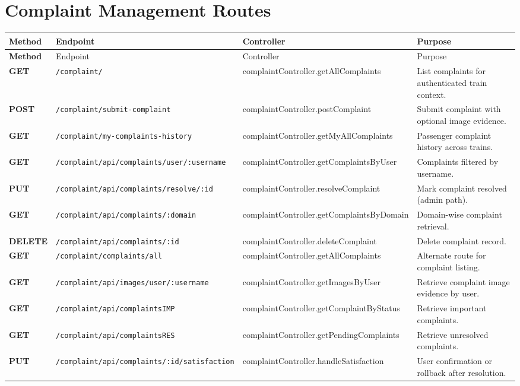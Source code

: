 \documentclass[12pt,a4paper]{report}
\begin{document}
\section{Complaint Management Routes}
\begin{longtable}{>{\bfseries}p{} p{} p{} p{}}
\toprule
\rowcolor{TableHeader}
\textcolor{TableHeaderText}{Method} & \textcolor{TableHeaderText}{Endpoint} & \textcolor{TableHeaderText}{Controller} & \textcolor{TableHeaderText}{Purpose} \\
\midrule
\endfirsthead
\toprule
\rowcolor{TableHeader}
\textcolor{TableHeaderText}{Method} & \textcolor{TableHeaderText}{Endpoint} & \textcolor{TableHeaderText}{Controller} & \textcolor{TableHeaderText}{Purpose} \\
\midrule
\endhead
GET & \texttt{/complaint/} & complaintController.getAllComplaints & List complaints for authenticated train context. \\
POST & \texttt{/complaint/submit-complaint} & complaintController.postComplaint & Submit complaint with optional image evidence. \\
GET & \texttt{/complaint/my-complaints-history} & complaintController.getMyAllComplaints & Passenger complaint history across trains. \\
GET & \texttt{/complaint/api/complaints/user/:username} & complaintController.getComplaintsByUser & Complaints filtered by username. \\
PUT & \texttt{/complaint/api/complaints/resolve/:id} & complaintController.resolveComplaint & Mark complaint resolved (admin path). \\
GET & \texttt{/complaint/api/complaints/:domain} & complaintController.getComplaintsByDomain & Domain-wise complaint retrieval. \\
DELETE & \texttt{/complaint/api/complaints/:id} & complaintController.deleteComplaint & Delete complaint record. \\
GET & \texttt{/complaint/complaints/all} & complaintController.getAllComplaints & Alternate route for complaint listing. \\
GET & \texttt{/complaint/api/images/user/:username} & complaintController.getImagesByUser & Retrieve complaint image evidence by user. \\
GET & \texttt{/complaint/api/complaintsIMP} & complaintController.getComplaintByStatus & Retrieve important complaints. \\
GET & \texttt{/complaint/api/complaintsRES} & complaintController.getPendingComplaints & Retrieve unresolved complaints. \\
PUT & \texttt{/complaint/api/complaints/:id/satisfaction} & complaintController.handleSatisfaction & User confirmation or rollback after resolution. \\
\bottomrule
\end{longtable}
\end{document}

